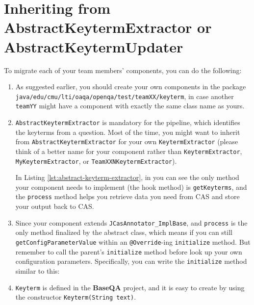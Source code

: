 
\section{Inheriting from AbstractKeytermExtractor or AbstractKeytermUpdater}

To migrate each of your team members' components, you can do the following:

\begin{enumerate}

\item As suggested earlier, you should create your own components in the package
\texttt{java/edu/cmu/lti/oaqa/openqa/test/teamXX/keyterm}, in case another
\texttt{teamYY} might have a component with exactly the same class name as
yours.

\item \texttt{AbstractKeytermExtractor} is mandatory for the pipeline, which
identifies the keyterms from a question. Most of the time, you might want to
inherit from \texttt{AbstractKeytermExtractor} for your own
\texttt{KeytermExtractor} (please think of a better name for your component
rather than \texttt{KeytermExtractor}, \texttt{MyKeytermExtractor}, or
\texttt{TeamXXNKeytermExtractor}).

In Listing \ref{lst:abstract-keyterm-extractor}, in you can see the only method
your component needs to implement (the hook method) is \verb|getKeyterms|, and
the \verb|process| method helps you retrieve data you need from CAS and store
your output back to CAS.



\item Since your component extends \verb|JCasAnnotator_ImplBase|, and
\verb|process| is the only method finalized by the abstract class, which means
if you can still \verb|getConfigParameterValue| within an \verb|@Override|-ing
\verb|initialize| method. But remember to call the parent's \verb|initialize|
method before look up your own configuration parameters. Specifically, you can
write the \verb|initialize| method similar to this:



\item \verb|Keyterm| is defined in the \textbf{BaseQA} project, and it is easy
to create by using the constructor \verb|Keyterm(String text)|.


\end{enumerate}
